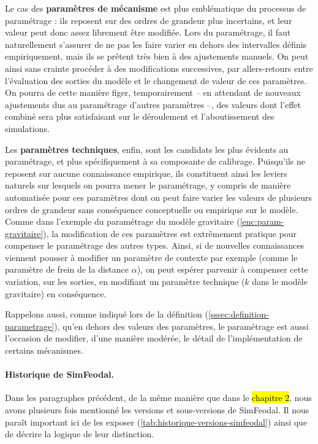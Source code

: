 Le cas des \textbf{paramètres de mécanisme} est plus emblématique du processus de paramétrage : ils reposent sur des ordres de grandeur plus incertains, et leur valeur peut donc assez librement être modifiée.
Lors du paramétrage, il faut naturellement s'assurer de ne pas les faire varier en dehors des intervalles définis empiriquement, mais ils se prêtent très bien à des ajustements manuels.
On peut ainsi sans crainte procéder à des modifications successives, par allers-retours entre l'évaluation des sorties du modèle et le changement de valeur de ces paramètres.
On pourra de cette manière figer, temporairement -- en attendant de nouveaux ajustements dus au paramétrage d'autres paramètres --, des valeurs dont l'effet combiné sera plus satisfaisant sur le déroulement et l'aboutissement des simulations.

Les \textbf{paramètres techniques}, enfin, sont les candidats les plus évidents au paramétrage, et plus spécifiquement à sa composante de calibrage.
Puisqu'ils ne reposent sur aucune connaissance empirique, ils constituent ainsi les \og leviers\fg{} naturels sur lesquels on pourra mener le paramétrage, y compris de manière automatisée pour ces paramètres dont on peut faire varier les valeurs de plusieurs ordres de grandeur sans conséquence conceptuelle ou empirique sur le modèle.
Comme dans l'exemple du paramétrage du modèle gravitaire (\cref{enc:param-gravitaire}), la modification de ces paramètres est extrêmement pratique pour compenser le paramétrage des autres types.
Ainsi, si de nouvelles connaissances viennent pousser à modifier un paramètre de contexte par exemple (comme le paramètre de frein de la distance $\alpha$), on peut espérer parvenir à compenser cette variation, sur les sorties, en modifiant un paramètre technique ($k$ dans le modèle gravitaire) en conséquence.

Rappelons aussi, comme indiqué lors de la définition (\cref{sssec:definition-parametrage}), qu'en dehors des valeurs des paramètres, le paramétrage est aussi l'occasion de modifier, d'une manière modérée, le détail de l'implémentation de certains mécanismes.


\clearpage
\paragraph{Historique de SimFeodal.}

Dans les paragraphes précédent, de la même manière que dans le \hl{chapitre 2}, nous avons plusieurs fois mentionné les versions et sous-versions de SimFeodal.
Il nous paraît important ici de les exposer (\cref{tab:historique-versions-simfeodal}) ainsi que de décrire la logique de leur distinction.

